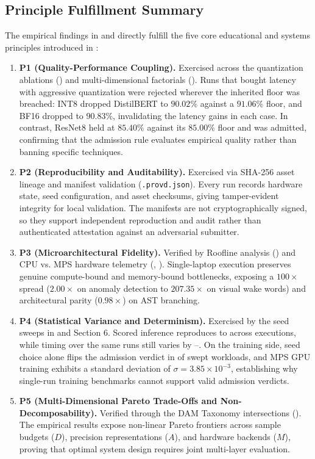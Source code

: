 \documentclass[10pt,twocolumn]{article}
\begin{document}
\subsection{Principle Fulfillment Summary}
\label{sec:principle_fulfillment}

The empirical findings in  and  directly fulfill the five core educational and systems principles introduced in :
\begin{enumerate}[leftmargin=*,itemsep=1.5pt]
\item \textbf{P1 (Quality-Performance Coupling).} Exercised across the quantization ablations () and multi-dimensional factorials (). Runs that bought latency with aggressive quantization were rejected wherever the inherited floor was breached: INT8 dropped DistilBERT to $90.02\%$ against a $91.06\%$ floor, and BF16 dropped to $90.83\%$, invalidating the latency gains in each case. In contrast, ResNet8 held at $85.40\%$ against its $85.00\%$ floor and was admitted, confirming that the admission rule evaluates empirical quality rather than banning specific techniques.
\item \textbf{P2 (Reproducibility and Auditability).} Exercised via SHA-256 asset lineage and manifest validation (\texttt{.provd.json}). Every run records hardware state, seed configuration, and asset checksums, giving tamper-evident integrity for local validation. The manifests are not cryptographically signed, so they support independent reproduction and audit rather than authenticated attestation against an adversarial submitter.
\item \textbf{P3 (Microarchitectural Fidelity).} Verified by Roofline analysis () and CPU vs. MPS hardware telemetry (, ). Single-laptop execution preserves genuine compute-bound and memory-bound bottlenecks, exposing a $100\times$ spread ($2.00\times$ on anomaly detection to $207.35\times$ on visual wake words) and architectural parity ($0.98\times$) on AST branching.
\item \textbf{P4 (Statistical Variance and Determinism).} Exercised by the seed sweeps in  and Section 6. Scored inference reproduces to \DeterminismMaxSeedSpread{} across \DeterminismExecutions{} executions, while timing over the same runs still varies by \FiveRunMinCV{}--\FiveRunMaxCV{}. On the training side, seed choice alone flips the admission verdict in \TrainingSeedFlipping{} of \TrainingSeedWorkloads{} swept workloads, and MPS GPU training exhibits a standard deviation of $\sigma = 3.85\times 10^{-3}$, establishing why single-run training benchmarks cannot support valid admission verdicts.
\item \textbf{P5 (Multi-Dimensional Pareto Trade-Offs and Non-Decomposability).} Verified through the DAM Taxonomy intersections (). The empirical results expose non-linear Pareto frontiers across sample budgets ($D$), precision representations ($A$), and hardware backends ($M$), proving that optimal system design requires joint multi-layer evaluation.
\end{enumerate}
\end{document}
